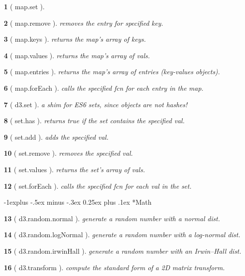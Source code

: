 \documentclass[10pt,landscape,letterpaper]{article}
\makeatletter
\newcounter{thm}
\newcommand{\hdrule}{\vspace{-4pt} \hdashrule[0.25ex]{\fill}{.5pt}{1pt}\vspace{-4pt}}
\theoremstyle{mytheoremstyle}
\newtheorem*{thm}{}
\renewcommand{\subsection}{\@startsection{subsection}{2}{0mm}%
                                {-1explus -.5ex minus -.3ex}%
                                {0.25ex plus .1ex}%
                                {\normalfont\normalsize\bfseries}}
\makeatother
\begin{document}
\begin{multicols}{3}
\begin{thm} [ map.set ]
\end{thm}\begin{thm} [ map.remove ]  removes the entry for specified key.
\end{thm}\begin{thm} [ map.keys ]  returns the map’s array of keys.
\end{thm}\begin{thm} [ map.values ]  returns the map’s array of vals.
\end{thm}\begin{thm} [ map.entries ]  returns the map’s array of entries (key-values objects).
\end{thm}\begin{thm} [ map.forEach ]  calls the specified fcn for each entry in the map.
\end{thm}\begin{thm} [ d3.set ]  a shim for ES6 sets, since objects are not hashes!
\end{thm}\begin{thm} [ set.has ]  returns true if the set contains the specified val.
\end{thm}\begin{thm} [ set.add ]  adds the specified val.
\end{thm}\begin{thm} [ set.remove ]  removes the specified val.
\end{thm}\begin{thm} [ set.values ]  returns the set’s array of vals.
\end{thm}\begin{thm} [ set.forEach ]  calls the specified fcn for each val in the set.\end{thm}
\hdrule
\subsection*{Math}

\begin{thm} [ d3.random.normal ]  generate a random number with a normal dist.
\end{thm}\begin{thm} [ d3.random.logNormal ]  generate a random number with a log-normal dist.
\end{thm}\begin{thm} [ d3.random.irwinHall ]  generate a random number with an Irwin–Hall dist.
\end{thm}\begin{thm} [ d3.transform ]  compute the standard form of a 2D matrix transform.\end{thm}
\hdrule

\end{multicols}
\end{document}
